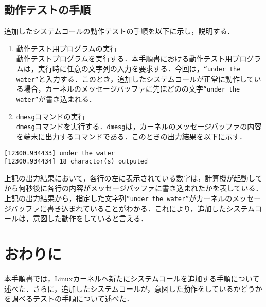 \documentclass[12pt]{jsarticle}
\begin{document}
\subsection{動作テストの手順}
追加したシステムコールの動作テストの手順を以下に示し，説明する．
\begin{enumerate}
\item 動作テスト用プログラムの実行\\
  動作テストプログラムを実行する．本手順書における動作テスト用プログラムは，実行時に任意の文字列の入力を要求する．今回は，\verb|“under the water”|と入力する．このとき，追加したシステムコールが正常に動作している場合，カーネルのメッセージバッファに先ほどのの文字\verb|“under the water”|が書き込まれる．
\item \verb|dmesg|コマンドの実行\\
  \verb|dmesg|コマンドを実行する．\verb|dmesg|は，カーネルのメッセージバッファの内容を端末に出力するコマンドである．このときの出力結果を以下に示す．
\end{enumerate}

\begin{verbatim}
[12300.934433] under the water
[12300.934434] 18 charactor(s) outputed
\end{verbatim}
上記の出力結果において，各行の左に表示されている数字は，計算機が起動してから何秒後に各行の内容がメッセージバッファに書き込まれたかを表している．上記の出力結果から，指定した文字列\verb|“under the water”|がカーネルのメッセージバッファに書き込まれていることがわかる．これにより，追加したシステムコールは，意図した動作をしていると言える．
\section{おわりに}
本手順書では，Linuxカーネルへ新たにシステムコールを追加する手順について述べた．さらに，追加したシステムコールが，意図した動作をしているかどうかを調べるテストの手順について述べた．



\end{document}
